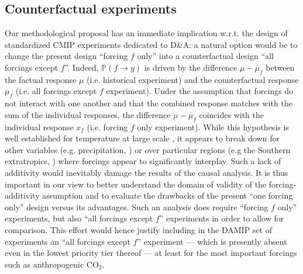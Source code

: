 \documentclass[12pt]{article}
\newcommand{\Proba}{\mathbb P}
\begin{document}
\subsection{Counterfactual experiments}
Our methodological proposal has an immediate implication w.r.t. the design of standardized CMIP experiments dedicated to D\&A: a natural option would be to change the present design ``forcing $f$ only'' into a counterfactual design ``all forcings except $f$''. Indeed, $\Proba(f\rightarrow y)$ is driven by the difference $\mu-\overline{\mu}_f$ between the factual response $\mu$ (i.e. historical experiment) and the counterfactual response $\overline{\mu}_f$ (i.e. all forcings except $f$ experiment).  Under the assumption that forcings do not interact with one another and that the combined response matches with the sum of the individual responses, the difference $\mu-\overline{\mu}_f$ coincides with the individual response $x_f$ (i.e. forcing $f$ only experiment). While this hypothesis is well established for temperature at large scale \citep{Gill04}, it appears to break down for other variables (e.g. precipitation, \citep{Sh13}) or over particular regions (e.g the Southern extratropics, \citep{Morg14}) where forcings appear to significantly interplay. Such a lack of additivity would inevitably damage the results of the causal analysis. It is thus important in our view to better understand the domain of validity of the forcing-additivity assumption and to evaluate the drawbacks of the present ``one forcing only'' design versus its advantages. Such an analysis does require ``forcing $f$ only'' experiments, but also ``all forcings except $f$'' experiments in order to allow for comparison. This effort would hence justify including in the DAMIP set of experiments an ``all forcings except $f$'' experiment --- which is presently absent even in the lowest priority tier thereof --- at least for the most important forcings such as anthropogenic CO$_2$.  %
\end{document}
